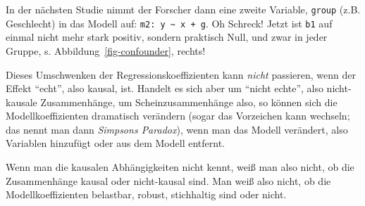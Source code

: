 \documentclass[
  letterpaper,
  oneside,
  open=any]{scrbook}
\theoremstyle{definition}
\theoremstyle{definition}
\theoremstyle{definition}
\theoremstyle{remark}
\begin{document}
In der nächsten Studie nimmt der Forscher dann eine zweite Variable,
\texttt{group} (z.B. Geschlecht) in das Modell auf:
\texttt{m2:\ y\ \textasciitilde{}\ x\ +\ g}. Oh Schreck! Jetzt ist
\texttt{b1} auf einmal nicht mehr stark positiv, sondern praktisch Null,
und zwar in jeder Gruppe, s. Abbildung~\ref{fig-confounder}, rechts!

Dieses Umschwenken der Regressionskoeffizienten kann \emph{nicht}
passieren, wenn der Effekt \enquote{echt}, also kausal, ist. Handelt es
sich aber um \enquote{nicht echte}, also nicht-kausale Zusammenhänge, um
Scheinzusammenhänge also, so können sich die Modellkoeffizienten
dramatisch verändern (sogar das Vorzeichen kann wechseln; das nennt man
dann \emph{Simpsons Paradox}), wenn man das Modell verändert, also
Variablen hinzufügt oder aus dem Modell entfernt.

Wenn man die kausalen Abhängigkeiten nicht kennt, weiß man also nicht,
ob die Zusammenhänge kausal oder nicht-kausal sind. Man weiß also nicht,
ob die Modellkoeffizienten belastbar, robust, stichhaltig sind oder
nicht.
\end{document}
